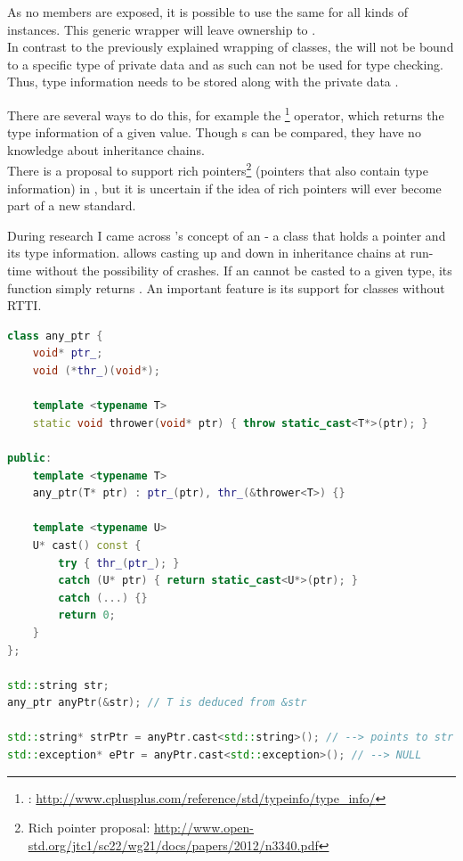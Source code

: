 As no members are exposed, it is possible to use the same  for all kinds of instances. This generic wrapper will leave ownership to .\\
In contrast to the previously explained wrapping of classes, the   will not be bound to a specific type of private data and as such can not be used for type checking. Thus, type information needs to be stored along with the private data .

There are several ways to do this, for example the  \footnote{: \url{http://www.cplusplus.com/reference/std/typeinfo/type_info/}} operator, which returns the type information of a given value. Though s can be compared, they have no knowledge about inheritance chains.\\
There is a proposal to support rich pointers\footnote{Rich pointer proposal: \url{http://www.open-std.org/jtc1/sc22/wg21/docs/papers/2012/n3340.pdf}} (pointers that also contain type information) in , but it is uncertain if the idea of rich pointers will ever become part of a new  standard.

During research I came across 's concept of an  - a class that holds a pointer and its type information.  allows casting up and down in inheritance chains at run-time without the possibility of crashes. If an  cannot be casted to a given type, its  function simply returns . An important feature is its support for classes without RTTI.

\begin{lstlisting}[language=C++, caption=Implementation of \mySCName{any\_ptr}]
class any_ptr {
    void* ptr_;
    void (*thr_)(void*);
 
    template <typename T>
    static void thrower(void* ptr) { throw static_cast<T*>(ptr); }
 
public:
    template <typename T>
    any_ptr(T* ptr) : ptr_(ptr), thr_(&thrower<T>) {}
 
    template <typename U>
    U* cast() const {
        try { thr_(ptr_); }
        catch (U* ptr) { return static_cast<U*>(ptr); }
        catch (...) {}
        return 0;
    }
};

std::string str;
any_ptr anyPtr(&str); // T is deduced from &str

std::string* strPtr = anyPtr.cast<std::string>(); // --> points to str
std::exception* ePtr = anyPtr.cast<std::exception>(); // --> NULL
\end{lstlisting}
\OnehalfSpacing

